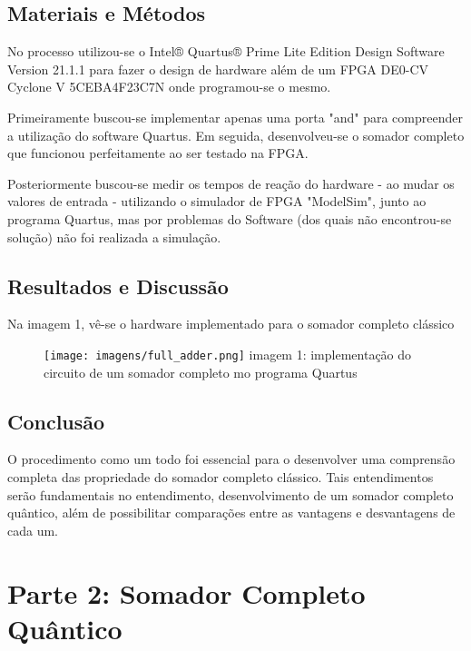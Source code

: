 \documentclass[12pt, a4paper]{article} %
\begin{document}
    \subsection{Materiais e Métodos}
    
        No processo utilizou-se o Intel® Quartus® Prime Lite Edition Design Software Version 21.1.1 para fazer o design de hardware além de um FPGA DE0-CV Cyclone V 5CEBA4F23C7N onde programou-se o mesmo.
    
        Primeiramente buscou-se implementar apenas uma porta "and" para compreender a utiliza\c{c}\~ao do software Quartus. Em seguida, desenvolveu-se o somador completo que funcionou perfeitamente ao ser testado na FPGA.
        
        Posteriormente buscou-se medir os tempos de rea\c{c}\~ao do hardware - ao mudar os valores de entrada - utilizando o simulador de FPGA "ModelSim", junto ao programa Quartus, mas por problemas do Software (dos quais n\~ao encontrou-se solu\c{c}\~ao) n\~ao foi realizada a simula\c{c}\~ao.
    
    \subsection{Resultados e Discussão}
    
        Na imagem 1, v\^e-se o hardware implementado para o somador completo cl\'assico
    
        \begin{figure}[H]
        \centering
        
        \texttt{[image: imagens/full\_adder.png]}
        imagem 1: implementa\c{c}\~ao do circuito de um somador completo mo programa Quartus
        
        \end{figure}
    
    \subsection{Conclusão}
    
        O procedimento como um todo foi essencial para o desenvolver uma comprensão completa das propriedade do somador completo cl\'assico. Tais entendimentos ser\~ao fundamentais no entendimento, desenvolvimento de um somador completo qu\^antico, al\'em de possibilitar compara\c{c}\~oes entre as vantagens e desvantagens de cada um.

\section{Parte 2: Somador Completo Qu\^antico}
\end{document}
